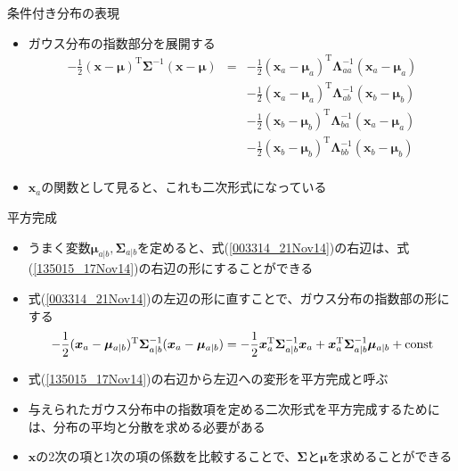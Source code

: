 \begin{frame}{条件付き分布の表現}
 \begin{itemize}
  \item ガウス分布の指数部分を展開する
        \begin{eqnarray}
         -\frac{1}{2}(\bm{x} - \bm{\mu})^{\mathrm{T}}\bm{\Sigma}^{-1}(\bm{x}-\bm{\mu}) &= &
          -\frac{1}{2}(\bm{x}_a - \bm{\mu}_a)^{\mathrm{T}}\bm{\Lambda}_{aa}^{-1}(\bm{x}_a-\bm{\mu}_a) \nonumber \\
         &&-\frac{1}{2}(\bm{x}_a - \bm{\mu}_a)^{\mathrm{T}}\bm{\Lambda}_{ab}^{-1}(\bm{x}_b-\bm{\mu}_b) \nonumber \\
         &&-\frac{1}{2}(\bm{x}_b - \bm{\mu}_b)^{\mathrm{T}}\bm{\Lambda}_{ba}^{-1}(\bm{x}_a-\bm{\mu}_a) \nonumber \\
         &&-\frac{1}{2}(\bm{x}_b - \bm{\mu}_b)^{\mathrm{T}}\bm{\Lambda}_{bb}^{-1}(\bm{x}_b-\bm{\mu}_b) \nonumber \\
         &&\label{003314_21Nov14}
        \end{eqnarray}
  \item $\bm{x}_a$の関数として見ると、これも\alert{二次形式}になっている
 \end{itemize}
\end{frame}

\begin{frame}{平方完成}
 \begin{itemize}
  \item うまく変数$\bm{\mu}_{a|b},\bm{\Sigma}_{a|b}$を定めると、式(\ref{003314_21Nov14})の右辺は、式(\ref{135015_17Nov14})の右辺の形にすることができる
  \item 式(\ref{003314_21Nov14})の左辺の形に直すことで、ガウス分布の指数部の形にする
        \begin{equation}
         -\frac{1}{2}(\bm{x}_a-\bm{\mu}_{a|b})^{\mathrm{T}}\bm{\Sigma}_{a|b}^{-1}(\bm{x}_a-\bm{\mu}_{a|b}) = -\frac{1}{2}\bm{x}_a^{\mathrm{T}}\bm{\Sigma}_{a|b}^{-1}\bm{x}_a+\bm{x}_a^{\mathrm{T}}\bm{\Sigma}_{a|b}^{-1}\bm{\mu}_{a|b} + {\rm const}\label{135015_17Nov14}
        \end{equation}
  \item 式(\ref{135015_17Nov14})の右辺から左辺への変形を\alert{平方完成}と呼ぶ

  \item 与えられたガウス分布中の指数項を定める二次形式を平方完成するためには、分布の平均と分散を求める必要がある
  \item $\bm{x}$の2次の項と1次の項の係数を比較することで、$\bm{\Sigma}$と$\bm{\mu}$を求めることができる
 \end{itemize}
\end{frame}

